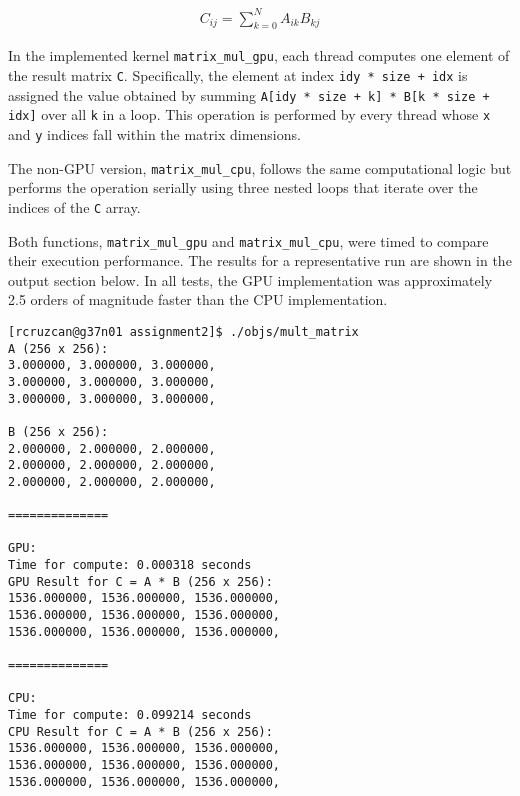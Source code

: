 \documentclass{article}
\begin{document}
\begin{align*}
    C_{ij} = \sum_{k=0}^N A_{ik}B_{kj}
\end{align*}

\noindent In the implemented kernel \texttt{matrix\_mul\_gpu}, each thread computes one element of the result matrix \texttt{C}. Specifically, the element at index \texttt{idy * size + idx} is assigned the value obtained by summing \texttt{A[idy * size + k] * B[k * size + idx]} over all \texttt{k} in a loop. This operation is performed by every thread whose \texttt{x} and \texttt{y} indices fall within the matrix dimensions.

The non-GPU version, \texttt{matrix\_mul\_cpu}, follows the same computational logic but performs the operation serially using three nested loops that iterate over the indices of the \texttt{C} array.

Both functions, \texttt{matrix\_mul\_gpu} and \texttt{matrix\_mul\_cpu}, were timed to compare their execution performance. The results for a representative run are shown in the output section below. In all tests, the GPU implementation was approximately 2.5 orders of magnitude faster than the CPU implementation.



\begin{lstlisting}[style=output]
[rcruzcan@g37n01 assignment2]$ ./objs/mult_matrix
A (256 x 256):
3.000000, 3.000000, 3.000000, 
3.000000, 3.000000, 3.000000, 
3.000000, 3.000000, 3.000000, 

B (256 x 256):
2.000000, 2.000000, 2.000000, 
2.000000, 2.000000, 2.000000, 
2.000000, 2.000000, 2.000000, 

==============

GPU:
Time for compute: 0.000318 seconds
GPU Result for C = A * B (256 x 256):
1536.000000, 1536.000000, 1536.000000, 
1536.000000, 1536.000000, 1536.000000, 
1536.000000, 1536.000000, 1536.000000, 

==============

CPU:
Time for compute: 0.099214 seconds
CPU Result for C = A * B (256 x 256):
1536.000000, 1536.000000, 1536.000000, 
1536.000000, 1536.000000, 1536.000000, 
1536.000000, 1536.000000, 1536.000000, 
\end{lstlisting}
\end{document}

